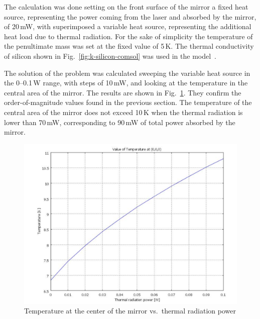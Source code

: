 The calculation was done setting on the front surface of the mirror a fixed heat source, representing the power coming from the laser and absorbed by the mirror, of 20\,mW, with superimposed a variable heat source, representing the additional heat load due to thermal radiation. For the sake of simplicity the temperature of the penultimate mass was set at the fixed value of 5\,K.  The thermal conductivity of silicon shown in Fig.~\ref{fig:k-silicon-comsol} was used in the model~\cite{k-silicon-comsol}.

The solution of the problem was calculated sweeping the variable heat source in the 0--0.1\,W range, with steps of 10\,mW, and looking at the temperature in the central area of the mirror. The results are shown in Fig.~\ref{fig:T-mirror-0-100}. They confirm the order-of-magnitude values found in the previous section. The temperature of the central area of the mirror does not exceed 10\,K when the thermal radiation is lower than 70\,mW, corresponding to 90\,mW of total power absorbed by the mirror.
\begin{figure}[htbp]
\begin{center}
 \includegraphics[width=12cm]{Sec_SiteInfra/Cryotraps/T_mirror-0-100.pdf}
			\caption{Temperature at the center of the mirror vs.\ thermal radiation power}
\label{fig:T-mirror-0-100}
\end{center}
\end{figure}


